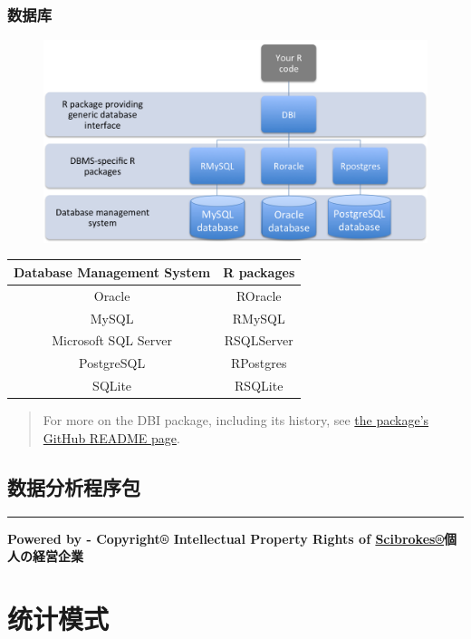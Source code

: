 \documentclass[]{book}
\begin{document}
\subsection{数据库}

\begin{figure}
\centering
\includegraphics{figure/database_management.jpg}
\caption{}
\end{figure}

\begin{longtable}[]{@{}cc@{}}
\toprule
Database Management System & R packages\tabularnewline
\midrule
\endhead
Oracle & ROracle\tabularnewline
MySQL & RMySQL\tabularnewline
Microsoft SQL Server & RSQLServer\tabularnewline
PostgreSQL & RPostgres\tabularnewline
SQLite & RSQLite\tabularnewline
\bottomrule
\end{longtable}

\begin{quote}
For more on the DBI package, including its history, see
\href{https://github.com/rstats-db/DBI}{the package's GitHub README
page}.
\end{quote}

\section{数据分析程序包}

\begin{center}\rule{0.5\linewidth}{\linethickness}\end{center}

\textbf{Powered by - Copyright® Intellectual Property Rights of
\href{http://www.scibrokes.com}{Scibrokes®}個人の経営企業}

\chapter{统计模式}\label{stats}
\end{document}
